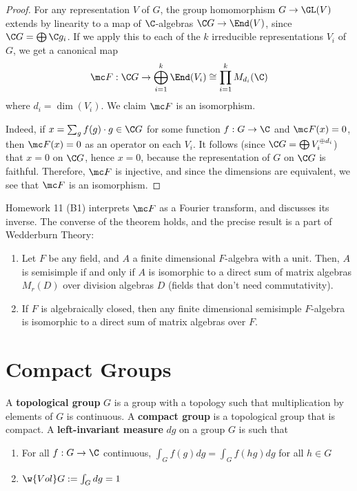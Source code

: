  \begin{proof}
     For any representation $V$ of $G$, the group homomorphism $G \to \GL(V)$ extends by linearity to a map of $\C$-algebras $\C G \to \End(V)$, since $\C G =\bigoplus \C g_i$. If we apply this to each of the $k$ irreducible representations $V_i$ of $G$, we get a canonical map
     $$\mc F: \C G \to \bigoplus_{i=1}^k \End (V_i) \cong \prod _{i=1}^kM_{d_i}(\C)$$
where $d_i = \dim (V_i)$. We claim $\mc F$ is an isomorphism.

Indeed, if $x = \sum_{g}f(g) \cdot g \in \C G$ for some function $f:G \to \C$ and $\mc F(x)=0$, then $\mc F(x)=0$ as an operator on each $V_i$. It follows (since $\C G = \bigoplus V_i^{\oplus d_i}$) that $x=0$ on $\C G$, hence $x=0$, because the representation of $G$ on $\C G$ is faithful. Therefore, $\mc F$ is injective, and since the dimensions are equivalent, we see that $\mc F$ is an isomorphism.
 \end{proof}

 Homework 11 (B1) interprets $\mc F$ as a Fourier transform, and discusses its inverse. The converse of the theorem holds, and the precise result is a part of Wedderburn Theory:

\begin{thm}
    \begin{enumerate}
        \item Let $F$ be any field, and $A$ a finite dimensional $F$-algebra with a unit. Then, $A$ is semisimple if and only if $A$ is isomorphic to a direct sum of matrix algebras $M_r(D)$ over division algebras $D$ (fields that don't need commutativity).
        \item If $F$ is algebraically closed, then any finite dimensional semisimple $F$-algebra is isomorphic to a direct sum of matrix algebras over $F$.
    \end{enumerate}
\end{thm}

\section{Compact Groups}

\begin{defn}
    A \textbf{topological group} $G$ is a group with a topology such that multiplication by elements of $G$ is continuous. A \textbf{compact group} is a topological group that is compact. A \textbf{left-invariant measure} $dg$ on a group $G$ is such that
    \begin{enumerate}
        \item[(i)] For all $f : G \to \C$ continuous, $\int _{G}f(g)dg=\int _Gf(hg)dg$ for all $h \in G$
        \item[(ii)] $\w{Vol} G:= \int _Gdg=1$
    \end{enumerate}
\end{defn}

